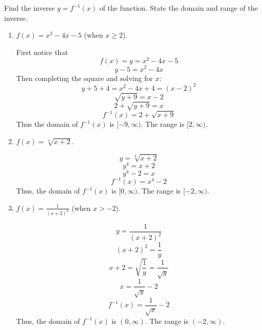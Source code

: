 \documentclass[nooutcomes]{ximera}
\begin{document}
\begin{problem}			
				
Find the inverse $y=f^{-1}(x)$ of the function.  State the domain and range of the inverse.
	
			\begin{enumerate}
			\item  $f(x)=x^2-4x-5$ (when $x\geq2$).
			
			 \begin{freeResponse}
			 First notice that			 
			 $$f(x)= y =x^2-4x-5 $$
			$$y-5=x^2-4x $$
			Then completing the square and solving for $x$:
			$$y+5+4=x^2-4x+4 = (x-2)^2$$
			$$ \sqrt{y+9}=x-2$$
			$$2+\sqrt{y+9}=x$$
			$$f^{-1}(x) = 2 + \sqrt{x + 9}$$
			Thus the domain of $f^{-1}(x)$ is $[-9,\infty )$.  The range is $[2,\infty )$.
			 \end{freeResponse}
			 
			\item  $f(x)=\sqrt[4]{x+2}$.
			
			 \begin{freeResponse}			 
			 $$y=\sqrt[4]{x+2}$$
			$$y^4 = x + 2$$
			$$y^4 - 2 = x$$
			$$f^{-1}(x) = x^4 - 2$$
			Thus, the domain of $f^{-1}(x)$ is $[0, \infty )$.  The range is $[-2, \infty )$.  
			 \end{freeResponse}
			 
			\item  $f(x)=\frac{1}{(x+2)^2}$  (when $x>-2$).
			
			 \begin{freeResponse}			 
			 $$y = \frac{1}{(x+2)^2}$$
			$$(x+2)^2 = \frac{1}{y}$$
			$$ x+2 = \sqrt{\frac{1}{y}} = \frac{1}{\sqrt{y}}$$
			$$x = \frac{1}{\sqrt{y}} - 2 $$
			$$f^{-1}(x) = \frac{1}{\sqrt{x}} - 2$$
			Thus, the domain of $f^{-1}(x)$ is $(0, \infty)$.  The range is $(-2, \infty )$. 
			 \end{freeResponse}
			 
			\end{enumerate}
			
\end{problem}
	
	
	
\end{document}
